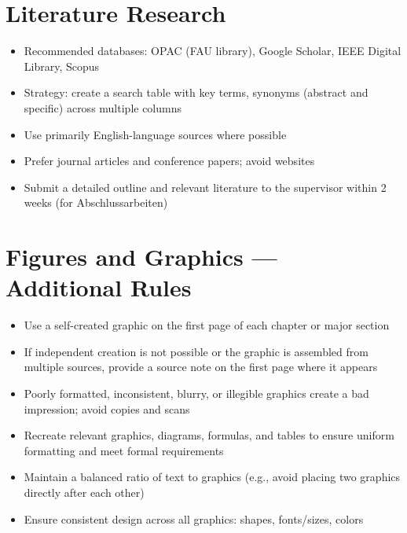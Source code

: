 \section{Literature Research}

\begin{itemize}
    \item Recommended databases: OPAC (FAU library), Google Scholar, IEEE Digital Library, Scopus
    \item Strategy: create a search table with key terms, synonyms (abstract and specific) across multiple columns
    \item Use primarily English-language sources where possible
    \item Prefer journal articles and conference papers; avoid websites
    \item Submit a detailed outline and relevant literature to the supervisor within 2 weeks (for Abschlussarbeiten)
\end{itemize}


\section{Figures and Graphics --- Additional Rules}

\begin{itemize}
    \item Use a self-created graphic on the first page of each chapter or major section
    \item If independent creation is not possible or the graphic is assembled from multiple sources, provide a source note on the first page where it appears
    \item Poorly formatted, inconsistent, blurry, or illegible graphics create a bad impression; avoid copies and scans
    \item Recreate relevant graphics, diagrams, formulas, and tables to ensure uniform formatting and meet formal requirements
    \item Maintain a balanced ratio of text to graphics (e.g., avoid placing two graphics directly after each other)
    \item Ensure consistent design across all graphics: shapes, fonts/sizes, colors
\end{itemize}


